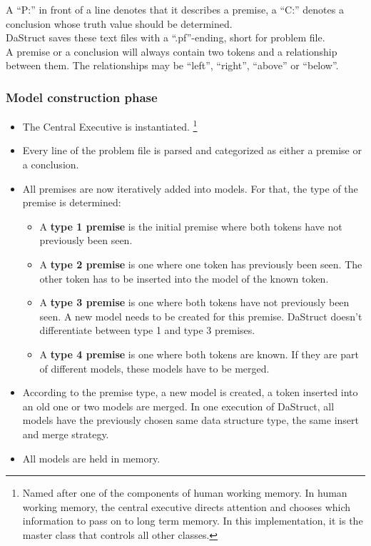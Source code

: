\documentclass[hidelinks]{scrartcl}
\begin{document}
A ``P:'' in front of a line denotes that it describes a \gls{premise}, a ``C:'' denotes a conclusion whose truth value should be determined. \\
DaStruct saves these text files with a ``.pf''-ending, short for problem file. \\
A \gls{premise} or a conclusion will always contain two \gls{token}s and a relationship between them. The relationships may be ``left'', ``right'', ``above'' or ``below''.

\subsubsection{Model construction phase}
\begin{itemize}
\item The Central Executive is instantiated. \footnote{Named after one of the components of human \gls{working memory}. In human \gls{working memory}, the central executive directs attention and chooses which information to pass on to long term memory. In this implementation, it is the master class that controls all other classes.}
\item Every line of the problem file is parsed and categorized as either a \gls{premise} or a \gls{conclusion}.
\item All \gls{premise}s are now iteratively added into models. For that, the type of the \gls{premise} is determined:
	\begin{itemize}
	\item A \textbf{type 1 \gls{premise}} is the initial \gls{premise} where both \gls{token}s have not previously been seen.
	\item A \textbf{type 2 \gls{premise}} is one where one \gls{token} has previously been seen. The other \gls{token} has to be inserted into the model of the known \gls{token}.
	\item A \textbf{type 3 \gls{premise}} is one where both \gls{token}s have not previously been seen. A new model needs to be created for this \gls{premise}. DaStruct doesn't differentiate between type 1 and type 3 \gls{premise}s.
	\item A \textbf{type 4 \gls{premise}} is one where both \gls{token}s are known. If they are part of different models, these models have to be merged.
	\end{itemize}
\item According to the \gls{premise} type, a new model is created, a \gls{token} inserted into an old one or two models are merged. In one execution of DaStruct, all models have the previously chosen same data structure type, the same insert and merge strategy.
\item All models are held in memory.
\end{itemize}
\end{document}
